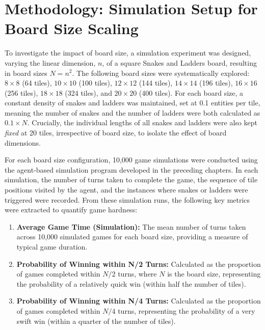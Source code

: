 \section{Methodology: Simulation Setup for Board Size Scaling}

To investigate the impact of board size, a simulation experiment was designed, varying the linear dimension, $n$, of a square Snakes and Ladders board, resulting in board sizes $N = n^2$. The following board sizes were systematically explored: $8 \times 8$ (64 tiles), $10 \times 10$ (100 tiles), $12 \times 12$ (144 tiles), $14 \times 14$ (196 tiles), $16 \times 16$ (256 tiles), $18 \times 18$ (324 tiles), and $20 \times 20$ (400 tiles).  For each board size, a constant density of snakes and ladders was maintained, set at 0.1 entities per tile, meaning the number of snakes and the number of ladders were both calculated as $0.1 \times N$.  Crucially, the individual lengths of all snakes and ladders were also kept \textit{fixed} at 20 tiles, irrespective of board size, to isolate the effect of board dimensions.

For each board size configuration, 10,000 game simulations were conducted using the agent-based simulation program developed in the preceding chapters. In each simulation, the number of turns taken to complete the game, the sequence of tile positions visited by the agent, and the instances where snakes or ladders were triggered were recorded. From these simulation runs, the following key metrics were extracted to quantify game hardness:

\begin{enumerate}
	\item \textbf{Average Game Time (Simulation):}  The mean number of turns taken across 10,000 simulated games for each board size, providing a measure of typical game duration.
	\item \textbf{Probability of Winning within N/2 Turns:} Calculated as the proportion of games completed within $N/2$ turns, where $N$ is the board size, representing the probability of a relatively quick win (within half the number of tiles).
	\item \textbf{Probability of Winning within N/4 Turns:}  Calculated as the proportion of games completed within $N/4$ turns, representing the probability of a very swift win (within a quarter of the number of tiles).
\end{enumerate}

